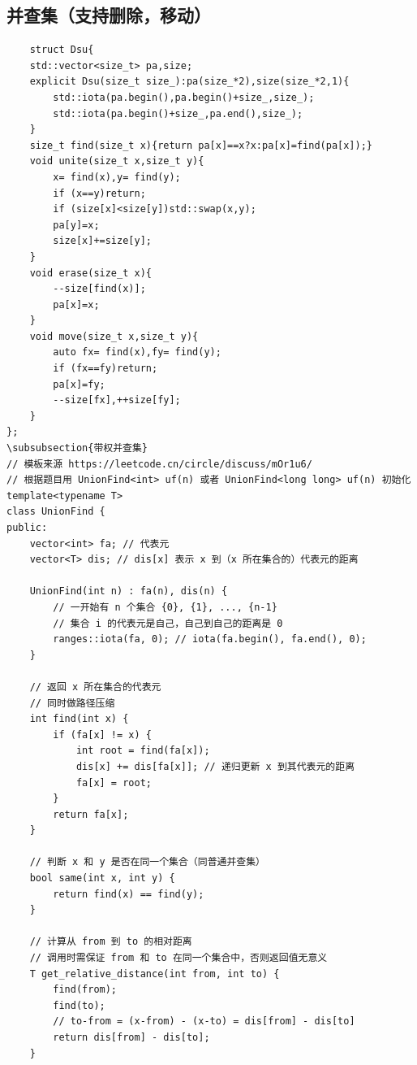 \documentclass[UTF8,twoside]{ctexart}
\begin{document}
\subsection{并查集（支持删除，移动）}
\begin{lstlisting}
    struct Dsu{
    std::vector<size_t> pa,size;
    explicit Dsu(size_t size_):pa(size_*2),size(size_*2,1){
        std::iota(pa.begin(),pa.begin()+size_,size_);
        std::iota(pa.begin()+size_,pa.end(),size_);
    }
    size_t find(size_t x){return pa[x]==x?x:pa[x]=find(pa[x]);}
    void unite(size_t x,size_t y){
        x= find(x),y= find(y);
        if (x==y)return;
        if (size[x]<size[y])std::swap(x,y);
        pa[y]=x;
        size[x]+=size[y];
    }
    void erase(size_t x){
        --size[find(x)];
        pa[x]=x;
    }
    void move(size_t x,size_t y){
        auto fx= find(x),fy= find(y);
        if (fx==fy)return;
        pa[x]=fy;
        --size[fx],++size[fy];
    }
};
\subsubsection{带权并查集}
// 模板来源 https://leetcode.cn/circle/discuss/mOr1u6/
// 根据题目用 UnionFind<int> uf(n) 或者 UnionFind<long long> uf(n) 初始化
template<typename T>
class UnionFind {
public:
    vector<int> fa; // 代表元
    vector<T> dis; // dis[x] 表示 x 到（x 所在集合的）代表元的距离

    UnionFind(int n) : fa(n), dis(n) {
        // 一开始有 n 个集合 {0}, {1}, ..., {n-1}
        // 集合 i 的代表元是自己，自己到自己的距离是 0
        ranges::iota(fa, 0); // iota(fa.begin(), fa.end(), 0);
    }

    // 返回 x 所在集合的代表元
    // 同时做路径压缩
    int find(int x) {
        if (fa[x] != x) {
            int root = find(fa[x]);
            dis[x] += dis[fa[x]]; // 递归更新 x 到其代表元的距离
            fa[x] = root;
        }
        return fa[x];
    }

    // 判断 x 和 y 是否在同一个集合（同普通并查集）
    bool same(int x, int y) {
        return find(x) == find(y);
    }

    // 计算从 from 到 to 的相对距离
    // 调用时需保证 from 和 to 在同一个集合中，否则返回值无意义
    T get_relative_distance(int from, int to) {
        find(from);
        find(to);
        // to-from = (x-from) - (x-to) = dis[from] - dis[to]
        return dis[from] - dis[to];
    }


\end{lstlisting}
\end{document}
